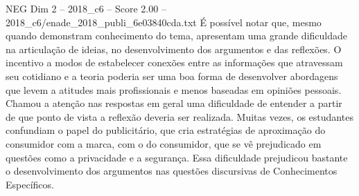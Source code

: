 \begin{textsample}{NEG Dim 2 – 2018\_c6 – Score 2.00 – 2018\_c6/enade\_2018\_publi\_6e03840cda.txt}
É possível notar que, mesmo quando demonstram conhecimento do tema, apresentam uma grande dificuldade na articulação de ideias, no desenvolvimento dos argumentos e das reflexões.
O incentivo a modos de estabelecer conexões entre as informações que atravessam seu cotidiano e a teoria poderia ser uma boa forma de desenvolver abordagens que levem a atitudes mais profissionais e menos baseadas em opiniões pessoais.
Chamou a atenção nas respostas em geral uma dificuldade de entender a partir de que ponto de vista a reflexão deveria ser realizada.
Muitas vezes, os estudantes confundiam o papel do publicitário, que cria estratégias de aproximação do consumidor com a marca, com o do consumidor, que se vê prejudicado em questões como a privacidade e a segurança.
Essa dificuldade prejudicou bastante o desenvolvimento dos argumentos nas questões discursivas de Conhecimentos Específicos.

\end{textsample}
